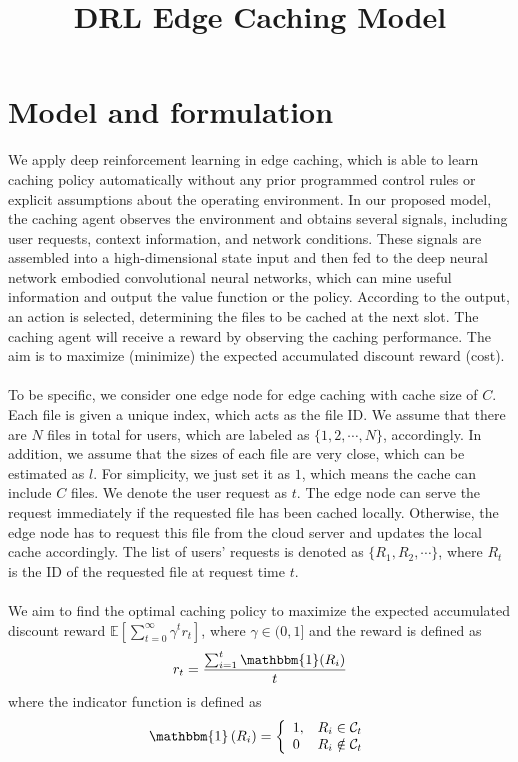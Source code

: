\documentclass[a4paper,12pt]{article}
\title{DRL Edge Caching Model}
\date{}
\begin{document}
\maketitle
\section{Model and formulation}

We apply deep reinforcement learning in edge caching, which is able to learn caching policy automatically without any prior programmed control rules or explicit assumptions about the operating environment. In our proposed model, the caching agent observes the environment and obtains several signals, including user requests, context information, and network conditions. These signals are assembled into a high-dimensional state input and then fed to the deep neural network embodied convolutional neural networks, which can mine useful information and output the value function or the policy. According to the output, an action is selected, determining the files to be cached at the next slot. The caching agent will receive a reward by observing the caching performance. The aim is to maximize (minimize) the expected accumulated discount reward (cost).\\~\\
To be specific, we consider one edge node for edge caching with cache size of $C$. Each file is given a unique index, which acts as the file ID. 
We assume that there are $N$ files in total for users, which are labeled as $\{1,2,\cdots,N\}$, accordingly. In addition, we assume that the sizes of each file are very close, which can be estimated as $l$. For simplicity, we just set it as $1$, which means the cache can include $C$ files. We denote the user request as $t$. The edge node can serve the request immediately if the requested file has been cached locally. Otherwise, the edge node has to request this file from the cloud server and updates the local cache accordingly. The list of users' requests is denoted as $\{R_1,R_2,\cdots\}$, where $R_t$ is the ID of the requested file at request time $t$. \\~\\
We aim to find the optimal caching policy to maximize the expected accumulated discount reward $\mathbb{E}\left[\sum_{t=0}^{\infty}\gamma^tr_t\right]$, where $\gamma\in(0,1]$ and the reward is defined as 
$$r_t=\frac{\sum_{i=1}^t\mathbbm{1}(R_i)}{t}$$
where the indicator function is defined as
$$
\mathbbm{1}\left(R_{i}\right)=\left\{\begin{array}{ll}{1,} & {R_{i} \in \mathcal{C}_{t}} \\ {0} & {R_{i} \notin \mathcal{C}_{t}}\end{array}\right.
$$
\end{document}
